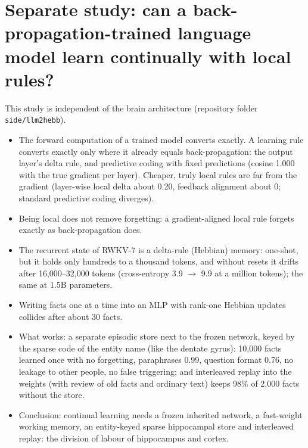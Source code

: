 \documentclass[11pt]{article}
\begin{document}
\section{Separate study: can a back-propagation-trained language model learn continually with local rules?}
\label{app:llm2hebb}
This study is independent of the brain architecture (repository folder \texttt{side/llm2hebb}).
\begin{itemize}
\item The forward computation of a trained model converts exactly. A learning rule converts exactly only where it already
equals back-propagation: the output layer's delta rule, and predictive coding with fixed predictions (cosine 1.000 with the
true gradient per layer). Cheaper, truly local rules are far from the gradient (layer-wise local delta about 0.20, feedback
alignment about 0; standard predictive coding diverges).
\item Being local does not remove forgetting: a gradient-aligned local rule forgets exactly as back-propagation does.
\item The recurrent state of RWKV-7 is a delta-rule (Hebbian) memory: one-shot, but it holds only hundreds to a thousand
tokens, and without resets it drifts after 16,000--32,000 tokens (cross-entropy 3.9 $\to$ 9.9 at a million tokens); the
same at 1.5B parameters.
\item Writing facts one at a time into an MLP with rank-one Hebbian updates collides after about 30 facts.
\item What works: a separate episodic store next to the frozen network, keyed by the sparse code of the entity name (like
the dentate gyrus): 10,000 facts learned once with no forgetting, paraphrases 0.99, question format 0.76, no leakage to other
people, no false triggering; and interleaved replay into the weights (with review of old facts and ordinary text) keeps
98\% of 2,000 facts without the store.
\item Conclusion: continual learning needs a frozen inherited network, a fast-weight working memory, an entity-keyed sparse
hippocampal store and interleaved replay: the division of labour of hippocampus and cortex.
\end{itemize}
\end{document}
